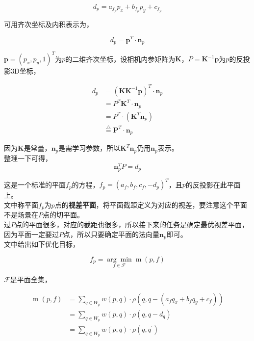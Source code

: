 \begin{equation}
	d_p = a_{f_p}p_x + b_{f_p}p_y+c_{f_p}\label{disparity_eq}
\end{equation}

可用齐次坐标及内积表示为，

$$
	d_p = \mathbf{p}^T\cdot \mathbf{n}_p
$$

$\mathbf{p}=(p_x,p_y,1)^T$为$p$的二维齐次坐标，设相机内参矩阵为$\mathbf{K}$，$P = \mathbf{K}^{-1}\mathbf{p}$为$p$的反投影3D坐标，

\begin{align*}
		d_p &= \left(\mathbf{K}\mathbf{K}^{-1}\mathbf{p}\right)^T\cdot \mathbf{n}_p \\
			& = P^T\mathbf{K}^T\cdot \mathbf{n}_p\\
			&= P^T\cdot \left(\mathbf{K}^T \mathbf{n}_p\right)\\
			&\overset{\triangle}{=}\mathbf{P}^T\cdot \mathbf{n}_p
\end{align*}

因为$\mathbf{K}$是常量，$\mathbf{n}_p$是需学习参数，所以$\mathbf{K}^T \mathbf{n}_p$仍用$\mathbf{n}_p$表示。\\

整理一下可得，
$$
	\mathbf{n}_p^T P =d_p
$$

这是一个标准的平面$f_p$的方程，$f_p = (a_f,b_f,c_f,-d_p)^T$，且$p$的反投影在此平面上。\\

文中称平面$f_p$为$p$点的\textbf{视差平面}，将平面截距定义为对应的视差，要注意这个平面不是场景在$P$点的切平面。\\

过$P$点的平面很多，对应的截距也很多，所以接下来的任务是确定最优视差平面，因为平面一定要过$P$点，所以只要确定平面的法向量$\mathbf{n}_p$即可。\\

文中给出如下优化目标，

\begin{equation}
	f_p = \underset{f\in \mathcal{F}}{\arg\min} \mathop{m}(p,f)\label{disparity_eq_opt}
\end{equation}

$\mathcal{F}$是平面全集，

\begin{align*}
	\mathop{m}(p,f) &= \sum_{q\in W_p} w(p,q)\cdot \rho\left(q,q-(a_{f}q_x + b_fq_y +c_f)\right) \\
	&= \sum_{q\in W_p} w(p,q)\cdot \rho\left(q,q-d_q\right)\\
	&= \sum_{q\in W_p} w(p,q)\cdot \rho\left(q,q^\prime\right)
\end{align*}

